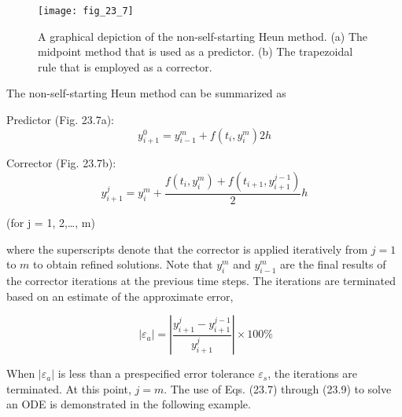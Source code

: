 \documentclass[../main.tex]{subfiles}
\begin{document}
\begin{figure}[H]
    \centering
    \texttt{[image: fig\_23\_7]}
   \caption{\textsf{A graphical depiction of the non-self-starting Heun method. (a) The midpoint method that is used as a predictor. (b) The trapezoidal rule that is employed as a corrector.}}\label{fig:fig_23_7}
\end{figure}
\noindent The non-self-starting Heun method can be summarized as

\noindent Predictor (Fig. 23.7a):
\begin{equation}
    \tag{23.7}
    y_{i+1}^{0}=y_{i-1}^{m}+f\left(t_{i}, y_{i}^{m}\right) 2 h
\end{equation}


\noindent Corrector (Fig. 23.7b):
\begin{equation}
    \tag{23.8}
    y_{i+1}^{j}=y_{i}^{m}+\frac{f\left(t_{i}, y_{i}^{m}\right)+f\left(t_{i+1}, y_{i+1}^{j-1}\right)}{2} h
\end{equation}
\begin{flushright}
    (for j = 1, 2,\ldots, m)
\end{flushright}

\noindent where the superscripts denote that the corrector is applied iteratively from $j = 1$ to $m$ to
obtain refined solutions. Note that $y_i^m$ and $y_{i-1}^m$ are the final results of the corrector
iterations at the previous time steps. The iterations are terminated based on an estimate of the approximate error,

\begin{equation}\
    \tag{23.9}
    \left|\varepsilon_{a}\right|=\left|\frac{y_{i+1}^{j}-y_{i+1}^{j-1}}{y_{i+1}^{j}}\right| \times 100 \%
\end{equation}

\noindent When $|\varepsilon_a|$ is less than a prespecified error tolerance $\varepsilon_s$, the iterations are terminated. At this point, $j = m$. The use of Eqs. (23.7) through (23.9) to solve an ODE is demonstrated in the following example.
\end{document}
